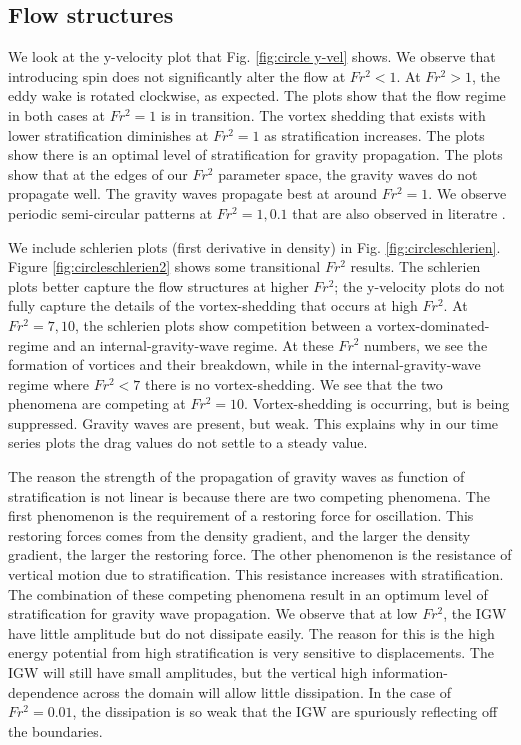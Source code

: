 \subsection{Flow structures}
We look at the y-velocity plot that Fig. \ref{fig:circle y-vel} shows. We observe that introducing spin does not significantly alter the flow at $Fr^2 < 1$. At $Fr^2 > 1$, the eddy wake is rotated clockwise, as expected. The plots show that the flow regime in both cases at $Fr^2 = 1$ is in transition. The vortex shedding that exists with lower stratification diminishes at $Fr^2 = 1$ as stratification increases. The plots show there is an optimal level of stratification for gravity propagation. The plots show that at the edges of our $Fr^2$ parameter space, the gravity waves do not propagate well. The gravity waves propagate best at around $Fr^2 = 1$. We observe periodic semi-circular patterns at $Fr^2 = 1, 0.1$ that are also observed in literatre \cite{ortiz-tarin_stratified_2019}.
 
We include schlerien plots (first derivative in density) in Fig. \ref{fig:circleschlerien}. Figure \ref{fig:circleschlerien2} shows some transitional $Fr^2$ results. The schlerien plots better capture the flow structures at higher $Fr^2$; the y-velocity plots do not fully capture the details of the vortex-shedding that occurs at high $Fr^2$. At $Fr^2 = 7, 10$, the schlerien plots show competition between a vortex-dominated-regime and an internal-gravity-wave regime. At these $Fr^2$ numbers, we see the formation of vortices and their breakdown, while in the internal-gravity-wave regime where $Fr^2 < 7$ there is no vortex-shedding. We see that the two phenomena are competing at $Fr^2 = 10$. Vortex-shedding is occurring, but is being suppressed. Gravity waves are present, but weak. This explains why in our time series plots the drag values do not settle to a steady value.
 
The reason the strength of the propagation of gravity waves as function of stratification is not linear is because there are two competing phenomena. The first phenomenon is the requirement of a restoring force for oscillation. This restoring forces comes from the density gradient, and the larger the density gradient, the larger the restoring force. The other phenomenon is the resistance of vertical motion due to stratification. This resistance increases with stratification. The combination of these competing phenomena result in an optimum level of stratification for gravity wave propagation. We observe that at low $Fr^2$, the IGW have little amplitude but do not dissipate easily. The reason for this is the high energy potential from high stratification is very sensitive to displacements. The IGW will still have small amplitudes, but the vertical high information-dependence across the domain will allow little dissipation. In the case of $Fr^2 = 0.01$, the dissipation is so weak that the IGW are spuriously reflecting off the boundaries.
 
